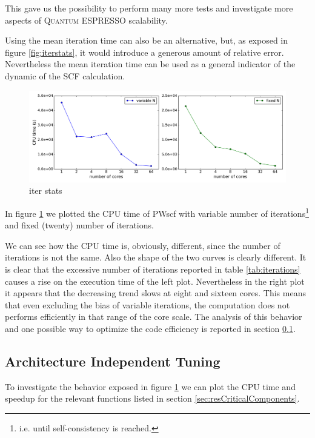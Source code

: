 \documentclass[a4paper,12pt]{article}
\newcommand\QE{\textsc{Quantum} ESPRESSO }
\begin{document}
This gave us the possibility to perform many more tests and investigate more aspects of \QE scalability.

Using the mean iteration time can also be an alternative, but, as exposed in figure \ref{fig:iterstats}, it would introduce a generous amount of relative error.
Nevertheless the mean iteration time can be used as a general indicator of the dynamic of the SCF calculation.

\newpage
\begin{figure}[hhh!]
	\centerline{\includegraphics[width=1.2\linewidth]{fixed_vs_variable.pdf}}
	\caption{ iter stats
	}
	\label{fig:fixedvsvariable}
\end{figure}

In figure \ref{fig:fixedvsvariable} we plotted the CPU time of PWscf with variable number of iterations\footnote{i.e. until self-consistency is reached.} and fixed (twenty) number of iterations.

We can see how the CPU time is, obviously, different, since the number of iterations is not the same.
Also the shape of the two curves is clearly different.
It is clear that the excessive number of iterations reported in table \ref{tab:iterations} causes a rise on the execution time of the left plot.
Nevertheless in the right plot it appears that the decreasing trend slows at eight and sixteen cores. This means that even excluding the bias of variable iterations, the computation does not performs efficiently in that range of the core scale.
The analysis of this behavior and one possible way to optimize the code efficiency is reported in section \ref{sec:resArchIndependent}.



\newpage
\subsection{Architecture Independent Tuning}\label{sec:resArchIndependent}

To investigate the behavior exposed in figure \ref{fig:fixedvsvariable} we can plot the CPU time and speedup for the relevant functions listed in section \ref{sec:resCriticalComponents}.
\end{document}
